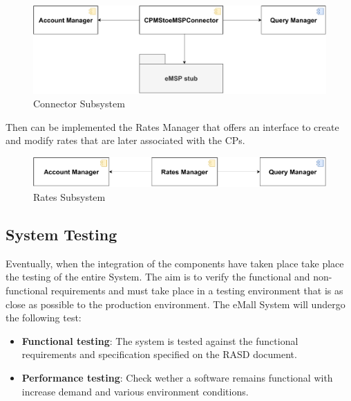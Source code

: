 \begin{figure}[H]
    \centering
    \includegraphics[scale=0.6]{src/Integration/CPMS_Connector.pdf}
    \caption{Connector Subsystem}
\end{figure}
Then can be implemented the Rates Manager that offers an interface to create and modify rates that
are later associated with the CPs.
\begin{figure}[H]
    \centering
    \includegraphics[scale=0.6]{src/Integration/CPMS_Rates.pdf}
    \caption{Rates Subsystem}
\end{figure}



\subsection{System Testing}
Eventually, when the integration of the components have taken place take place the testing of the entire System. 
The aim is to verify the functional and non-functional requirements and must take place in a testing
environment that is as close as possible to the production environment. 
The eMall System will undergo the following test:
\begin{itemize}
    \item \textbf{Functional testing}: The system is tested against the functional requirements and specification 
    specified on the RASD document.
    \item \textbf{Performance testing}: Check wether a software remains functional with increase demand and 
    various environment conditions.
\end{itemize}
